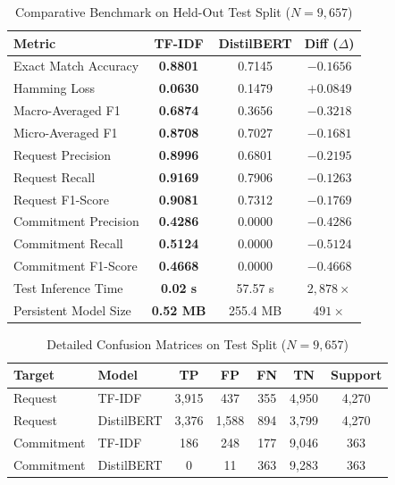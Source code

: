 \documentclass[conference]{IEEEtran}
\begin{document}
\begin{table}[htbp]
\caption{Comparative Benchmark on Held-Out Test Split ($N=9,657$)}
\begin{center}
\begin{tabular}{lccc}
\toprule
\textbf{Metric} & \textbf{TF-IDF} & \textbf{DistilBERT} & \textbf{Diff ($\Delta$)} \\
\midrule
Exact Match Accuracy & \textbf{0.8801} & 0.7145 & $-0.1656$ \\
Hamming Loss & \textbf{0.0630} & 0.1479 & $+0.0849$ \\
Macro-Averaged F1 & \textbf{0.6874} & 0.3656 & $-0.3218$ \\
Micro-Averaged F1 & \textbf{0.8708} & 0.7027 & $-0.1681$ \\
Request Precision & \textbf{0.8996} & 0.6801 & $-0.2195$ \\
Request Recall & \textbf{0.9169} & 0.7906 & $-0.1263$ \\
Request F1-Score & \textbf{0.9081} & 0.7312 & $-0.1769$ \\
Commitment Precision & \textbf{0.4286} & 0.0000 & $-0.4286$ \\
Commitment Recall & \textbf{0.5124} & 0.0000 & $-0.5124$ \\
Commitment F1-Score & \textbf{0.4668} & 0.0000 & $-0.4668$ \\
Test Inference Time & \textbf{0.02 s} & 57.57 s & $2,878\times$ \\
Persistent Model Size & \textbf{0.52 MB} & 255.4 MB & $491\times$ \\
\bottomrule
\end{tabular}
\label{tab:benchmark}
\end{center}
\end{table}

\begin{table}[htbp]
\caption{Detailed Confusion Matrices on Test Split ($N=9,657$)}
\begin{center}
\begin{tabular}{llccccc}
\toprule
\textbf{Target} & \textbf{Model} & \textbf{TP} & \textbf{FP} & \textbf{FN} & \textbf{TN} & \textbf{Support} \\
\midrule
Request & TF-IDF & 3,915 & 437 & 355 & 4,950 & 4,270 \\
Request & DistilBERT & 3,376 & 1,588 & 894 & 3,799 & 4,270 \\
Commitment & TF-IDF & 186 & 248 & 177 & 9,046 & 363 \\
Commitment & DistilBERT & 0 & 11 & 363 & 9,283 & 363 \\
\bottomrule
\end{tabular}
\label{tab:confusion}
\end{center}
\end{table}
\end{document}
